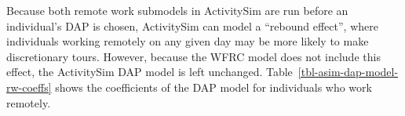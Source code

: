 \documentclass[fancy, twoside, mastersfancy, ms]{byuthesis}
\begin{document}
\begin{table}

\caption{\label{tbl-baseline-telecommute}Telecommute Rates and
Coefficients by Job Industry}


\end{table}%

Because both remote work submodels in ActivitySim are run before an
individual's DAP is chosen, ActivitySim can model a ``rebound effect'',
where individuals working remotely on any given day may be more likely
to make discretionary tours. However, because the WFRC model does not
include this effect, the ActivitySim DAP model is left unchanged.
Table~\ref{tbl-asim-dap-model-rw-coeffs} shows the coefficients of the
DAP model for individuals who work remotely.
\end{document}

